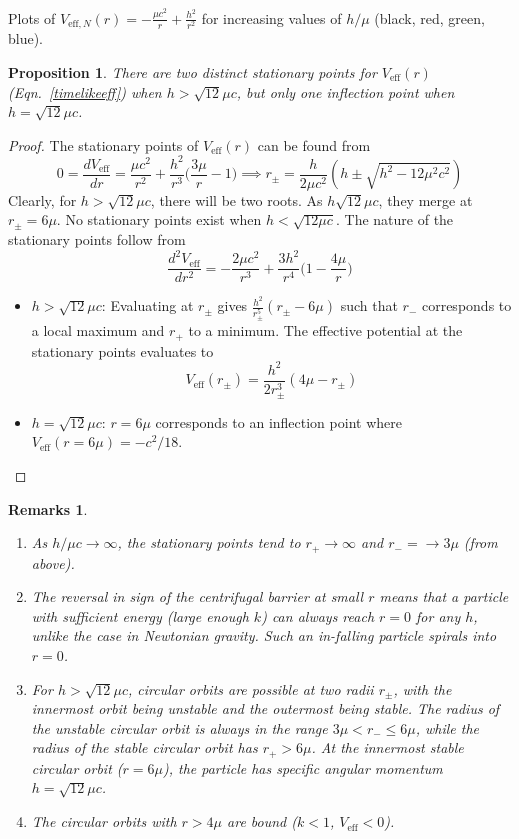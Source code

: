 \documentclass[a4paper]{article}
\newtheorem{remarks}{Remarks}[section]
\theoremstyle{new}
\newtheorem{prop}{Proposition}[section]
\begin{document}
Plots of $V_{\text{eff},N}(r)=-\frac{\mu c^2}{r}+\frac{h^2}{r^2}$ for increasing values of $h/\mu$ (black, red, green, blue).
\begin{prop}
There are two distinct stationary points for $V_{\text{eff}}(r)$ (Eqn.~\ref{timelikeeff}) when $h>\sqrt{12}\mu c$, but only one  inflection point when $h=\sqrt{12}\mu c$. 
\end{prop}
\begin{proof}
The stationary points of $V_{\text{eff}}(r)$ can be found from
$$0=\frac{dV_{\text{eff}}}{dr}=\frac{\mu c^2}{r^2}+\frac{h^2}{r^3}\bigg(\frac{3\mu}{r}-1\bigg)\implies r_\pm=\frac{h}{2\mu c^2}(h\pm\sqrt{h^2-12\mu^2c^2})$$
Clearly, for $h>\sqrt{12}\mu c$, there will be two roots. As $h\sqrt{12}\mu c$, they merge at $r_\pm=6\mu$. No stationary points exist when $h<\sqrt{12\mu c}$.
The nature of the stationary points follow from
$$\frac{d^2V_{\text{eff}}}{dr^2}=-\frac{2\mu c^2}{r^3}+\frac{3h^2}{r^4}\bigg(1-\frac{4\mu}{r}\bigg)$$
\begin{itemize}
\item $h>\sqrt{12}\mu c$: Evaluating at $r_\pm$ gives $\frac{h^2}{r_\pm^5}(r_\pm-6\mu)$ such that $r_-$ corresponds to a local maximum and $r_+$ to a minimum. The effective potential at the stationary points evaluates to
$$V_{\text{eff}}(r_\pm)=\frac{h^2}{2r_\pm^3}(4\mu-r_\pm)$$
\item $h=\sqrt{12}\mu c$: $r=6\mu$ corresponds to an inflection point where $V_{\text{eff}}(r=6\mu)=-c^2/18$.
\end{itemize}
\end{proof}
\begin{remarks}\leavevmode
\begin{enumerate}
    \item As $h/\mu c\rightarrow\infty$, the stationary points tend to $r_+\rightarrow\infty$ and $r_-=\rightarrow 3\mu$ (from above).
    \item The reversal in sign of the centrifugal barrier at small $r$ means that a particle with sufficient energy (large enough $k$) can always reach $r=0$ for any $h$, unlike the case in Newtonian gravity. Such an in-falling particle spirals into $r=0$.
    \item For $h>\sqrt{12}\mu c$, circular orbits are possible at two radii $r_\pm$, with the innermost orbit being unstable and the outermost being stable. The radius of the unstable circular orbit is always in the range $3\mu<r_-\leq 6\mu$, while the radius of the stable circular orbit has $r_+>6\mu$. At the innermost stable circular orbit ($r=6\mu$), the particle has specific angular momentum $h=\sqrt{12}\mu c$.
    \item The circular orbits with $r>4\mu$ are bound ($k<1$, $V_{\text{eff}}<0$).
\end{enumerate}
\end{remarks}
\end{document}
